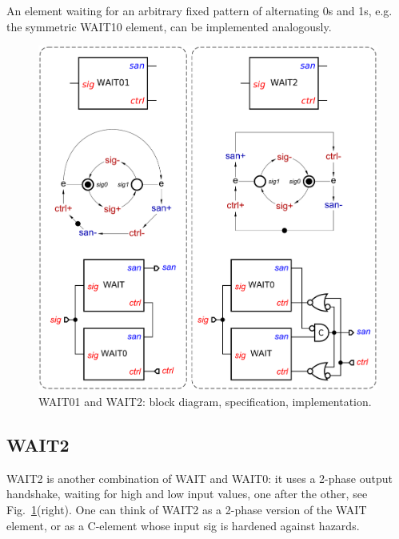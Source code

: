 \documentclass[conference]{IEEEtran}
\begin{document}
An element waiting for an arbitrary fixed pattern of alternating 0s and 1s, e.g.
the symmetric \textsf{WAIT10} element, can be implemented analogously.

\begin{figure}
\begin{center}
    \includegraphics[scale=0.23]{fig/WAIT01-and-WAIT2.pdf}
    \vspace{-6mm}
    \caption{\textsf{WAIT01} and \textsf{WAIT2}: block diagram,
    specification, implementation.}
    \label{fig:wait012}
    \vspace{-7mm}
\end{center}
\end{figure}

\subsection*{\textsf{WAIT2}}

\textsf{WAIT2} is another combination of \textsf{WAIT} and \textsf{WAIT0}:
it uses a 2-phase output handshake, waiting for high and low input values, one after
the other, see Fig.~\ref{fig:wait012}(right). One can think of \textsf{WAIT2} as a 2-phase
version of the \textsf{WAIT} element, or as a C-element whose input \textsf{sig} is hardened
against hazards.
\end{document}
